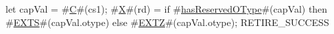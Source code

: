 let capVal = #\hyperref[sailRISCVzC]{C}#(cs1);
#\hyperref[sailRISCVzX]{X}#(rd) = if   #\hyperref[sailRISCVzhasReservedOType]{hasReservedOType}#(capVal)
        then #\hyperref[sailRISCVzEXTS]{EXTS}#(capVal.otype)
        else #\hyperref[sailRISCVzEXTZ]{EXTZ}#(capVal.otype);
RETIRE_SUCCESS
